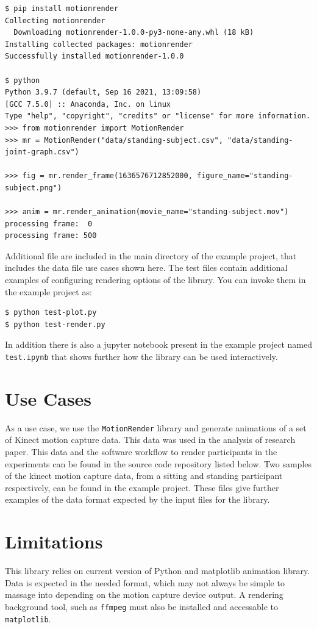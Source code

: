 \documentclass[10pt,a4paper]{article}
\begin{document}
\begin{verbatim}
$ pip install motionrender
Collecting motionrender
  Downloading motionrender-1.0.0-py3-none-any.whl (18 kB)
Installing collected packages: motionrender
Successfully installed motionrender-1.0.0

$ python
Python 3.9.7 (default, Sep 16 2021, 13:09:58) 
[GCC 7.5.0] :: Anaconda, Inc. on linux
Type "help", "copyright", "credits" or "license" for more information.
>>> from motionrender import MotionRender
>>> mr = MotionRender("data/standing-subject.csv", "data/standing-joint-graph.csv")

>>> fig = mr.render_frame(1636576712852000, figure_name="standing-subject.png")

>>> anim = mr.render_animation(movie_name="standing-subject.mov")
processing frame:  0
processing frame: 500
\end{verbatim}

Additional file are included in the main directory of the
example project, that includes the data file use cases shown
here.  The test files contain additional examples of configuring
rendering options of the library.  You can invoke them
in the example project as:

\begin{verbatim}
$ python test-plot.py
$ python test-render.py
\end{verbatim}

In addition there is also a jupyter notebook present
in the example project named \verb|test.ipynb|
that shows further how the library can be used interactively.
\\

\section*{Use Cases} %
As a use case, we use the \verb|MotionRender| library and generate animations of
a set of Kinect motion capture data.  This data was used in the analysis
of \cite{caron-2022} research paper.  This data and the software workflow to render
participants in the experiments can be found in the source code repository
listed below.  Two samples of the kinect motion capture data, from a
sitting and standing participant respectively, can be found in the example project.
These files give further examples of the data format expected by
the input files for the library.


\section*{Limitations} %
This library relies on current version of Python and matplotlib
animation library.  Data is expected in the needed format, which may
not always be simple to massage into depending on the motion capture
device output.  A rendering background tool, such as
\verb|ffmpeg| must also be installed and accessable to
\verb|matplotlib|.
\end{document}
